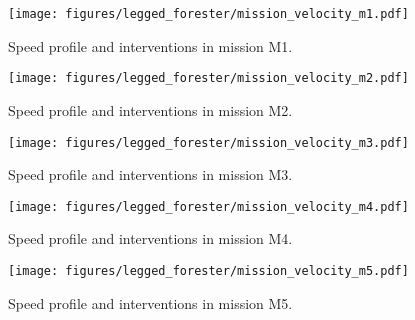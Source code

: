 \begin{figure}[ht]
	\centering
	\texttt{[image: figures/legged\_forester/mission\_velocity\_m1.pdf]}
	\caption{Speed profile and interventions in mission M1.}
	\label{fig:alf-m1-speed}
\end{figure}

\begin{figure}[ht]
	\centering
	\texttt{[image: figures/legged\_forester/mission\_velocity\_m2.pdf]}
	\caption{Speed profile and interventions in mission M2.}
	\label{fig:alf-m2-speed}
\end{figure}

\begin{figure}[ht]
	\centering
	\texttt{[image: figures/legged\_forester/mission\_velocity\_m3.pdf]}
	\caption{Speed profile and interventions in mission M3.}
	\label{fig:alf-m3-speed}
\end{figure}

\begin{figure}[ht]
	\centering
	\texttt{[image: figures/legged\_forester/mission\_velocity\_m4.pdf]}
	\caption{Speed profile and interventions in mission M4.}
	\label{fig:alf-m4-speed}
\end{figure}


\begin{figure}[!ht]
	\centering
	\texttt{[image: figures/legged\_forester/mission\_velocity\_m5.pdf]}
	\caption{Speed profile and interventions in mission M5.}
	\label{fig:alf-m5-speed}
\end{figure}
